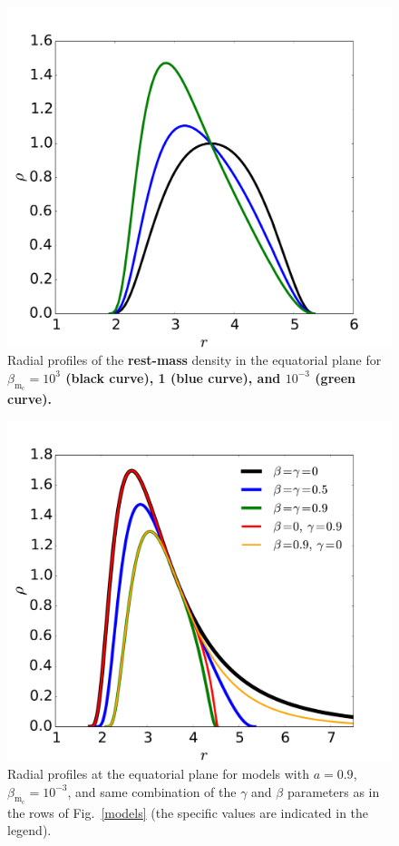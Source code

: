 \documentclass[]{aa}
\begin{document}
\begin{figure}[t]
\centering
\includegraphics[scale=0.2]{figures/fig4.pdf}
\caption{Radial profiles of the {\bf rest-mass} density in the equatorial plane for \bf{$\beta_{\mathrm{m}_{\mathrm{c}}}=10^3$} (black curve), 1 (blue curve), and $10^{-3}$ (green curve). }
\label{magnetisation-profile}
 \end{figure}
 
\begin{figure}[t]
\centering
\includegraphics[scale=0.2]{figures/fig5.pdf}
\caption{Radial profiles at the equatorial plane for models with $a=0.9$, $\beta_{\mathrm{m}_{\mathrm{c}}}
=10^{-3}$, and same combination of the $\gamma$ and $\beta$ parameters as in the rows of Fig.~\ref{models} (the specific values are indicated in the legend).}
\label{more-profile}
\end{figure}
\end{document}
